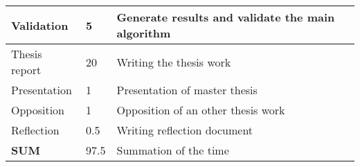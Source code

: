 \begin{table}[H]
\begin{tabular}{|p{}|p{}|p{}|}
		Validation                 & 5                 & Generate results and validate the main algorithm            \\ \hline
		Thesis report              & 20                & Writing the thesis work                                     \\ \hline
		Presentation               & 1                 & Presentation of master thesis                               \\ \hline
		Opposition                 & 1                 & Opposition of an other thesis work                          \\ \hline
		Reflection                 & 0.5               & Writing reflection document                                 \\ \hline
		\textbf{SUM}               & 97.5                & Summation of the time                                       \\ \hline
	\end{tabular}
\end{table}

